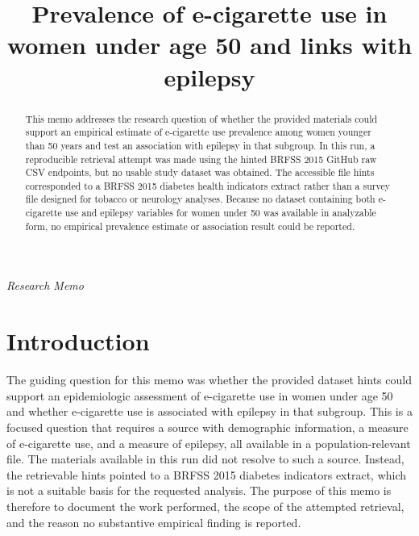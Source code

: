 \documentclass[11pt]{article}
\title{Prevalence of e-cigarette use in women under age 50 and links with epilepsy}
\author{}
\date{}
\begin{document}
\maketitle

\begin{center}\small\textit{Research Memo}\end{center}

\begin{abstract}

This memo addresses the research question of whether the provided materials could support an empirical estimate of e-cigarette use prevalence among women younger than 50 years and test an association with epilepsy in that subgroup. In this run, a reproducible retrieval attempt was made using the hinted BRFSS 2015 GitHub raw CSV endpoints, but no usable study dataset was obtained. The accessible file hints corresponded to a BRFSS 2015 diabetes health indicators extract rather than a survey file designed for tobacco or neurology analyses. Because no dataset containing both e-cigarette use and epilepsy variables for women under 50 was available in analyzable form, no empirical prevalence estimate or association result could be reported.

\end{abstract}

\section{Introduction}
The guiding question for this memo was whether the provided dataset hints could support an epidemiologic assessment of e-cigarette use in women under age 50 and whether e-cigarette use is associated with epilepsy in that subgroup. This is a focused question that requires a source with demographic information, a measure of e-cigarette use, and a measure of epilepsy, all available in a population-relevant file. The materials available in this run did not resolve to such a source. Instead, the retrievable hints pointed to a BRFSS 2015 diabetes indicators extract, which is not a suitable basis for the requested analysis. The purpose of this memo is therefore to document the work performed, the scope of the attempted retrieval, and the reason no substantive empirical finding is reported.
\end{document}
